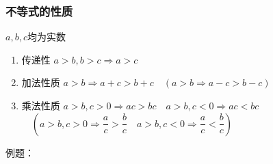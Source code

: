 \subsubsection*{不等式的性质}
$a, b, c$均为实数
\begin{enumerate}
    \item 传递性 $a > b, b > c \Longrightarrow a > c$
    \item 加法性质 $a > b \Longrightarrow a + c > b + c \quad (a > b \Longrightarrow a - c > b - c)$
    \item 乘法性质 $a > b, c > 0 \Longrightarrow ac > bc \quad a > b, c < 0 \Longrightarrow ac < bc$ \\ 
    $ \quad \left(a > b, c > 0 \Longrightarrow \dfrac{a}{c} > \dfrac{b}{c} \quad a > b, c < 0 \Longrightarrow \dfrac{a}{c} < \dfrac{b}{c}\right)$ 
\end{enumerate}
例题：
